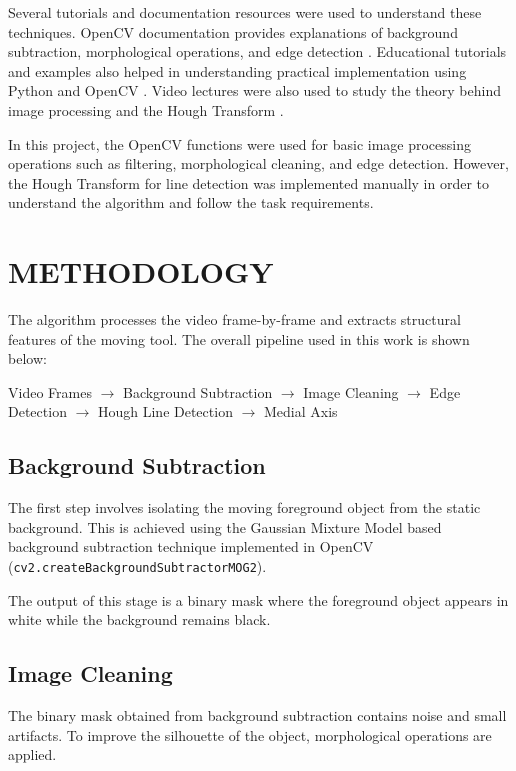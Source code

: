 \documentclass[letterpaper,10pt,conference]{ieeeconf}
\begin{document}
Several tutorials and documentation resources were used to understand these techniques. 
OpenCV documentation provides explanations of background subtraction, morphological operations, and edge detection \cite{opencv_docs}. 
Educational tutorials and examples also helped in understanding practical implementation using Python and OpenCV \cite{gfg_opencv}. 
Video lectures were also used to study the theory behind image processing and the Hough Transform \cite{yt_cv_course, yt_opencv_video}.

In this project, the OpenCV functions were used for basic image processing operations such as filtering, morphological cleaning, and edge detection. 
However, the Hough Transform for line detection was implemented manually in order to understand the algorithm and follow the task requirements.


\section{METHODOLOGY}

The algorithm processes the video frame-by-frame and extracts structural features of the moving tool. 
The overall pipeline used in this work is shown below:

\begin{center}
Video Frames $\rightarrow$ Background Subtraction $\rightarrow$ Image Cleaning $\rightarrow$ Edge Detection $\rightarrow$ Hough Line Detection $\rightarrow$ Medial Axis
\end{center}


\subsection{Background Subtraction}

The first step involves isolating the moving foreground object from the static background. 
This is achieved using the Gaussian Mixture Model based background subtraction technique implemented in OpenCV 
(\texttt{cv2.createBackgroundSubtractorMOG2}). 

The output of this stage is a binary mask where the foreground object appears in white while the background remains black.


\subsection{Image Cleaning}

The binary mask obtained from background subtraction contains noise and small artifacts. 
To improve the silhouette of the object, morphological operations are applied.
\end{document}

